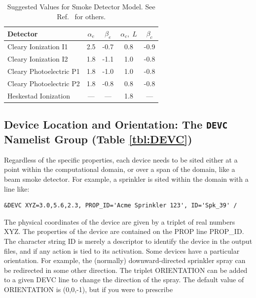\documentclass[11pt]{book}
\begin{document}
\begin{table}[ht]
\caption{Suggested Values for Smoke Detector Model. See Ref.~\cite{SFPE} for others.}
\vspace{0.1in}
\label{tab:sdvalues}
\begin{center}
\begin{tabular}{|l||c|c|c|c|}
\hline
Detector                      & $\alpha_e$  &  $\beta_e$   &  $\alpha_c, \; L$   &  $\beta_c$  \\ \hline \hline
Cleary Ionization    I1       & 2.5         & -0.7         &  0.8                &  -0.9      \\ \hline
Cleary Ionization    I2       & 1.8         & -1.1         &  1.0                &  -0.8      \\ \hline
Cleary Photoelectric P1       & 1.8         & -1.0         &  1.0                &  -0.8      \\ \hline
Cleary Photoelectric P2       & 1.8         & -0.8         &  0.8                &  -0.8      \\ \hline
Heskestad Ionization          & ---         & ---          &  1.8                &  ---       \\ \hline\end{tabular}
\end{center}
\end{table}



\subsection{Device Location and Orientation: The \texorpdfstring{{\tt DEVC}}{DEVC} Namelist Group (Table \ref{tbl:DEVC})}
\label{info:DEVC}

Regardless of the specific properties, each device needs to be sited either at a point within the computational domain, or
over a span of the domain, like a beam smoke detector. For example, a sprinkler is sited within the domain with a line like:

\footnotesize
\begin{verbatim}
&DEVC XYZ=3.0,5.6,2.3, PROP_ID='Acme Sprinkler 123', ID='Spk_39' /
\end{verbatim}
\normalsize

\noindent
The physical coordinates of the
device are given by a triplet of real numbers {\ct XYZ}.
The properties of the device are contained on the {\ct PROP} line {\ct PROP\_ID}.
The character string {\ct ID} is merely a descriptor to identify the
device in the output files, and if any action is tied to its activation.
Some devices have a particular orientation. For example, the (normally) downward-directed sprinkler
spray can be redirected in some other direction. The triplet
{\ct ORIENTATION} can be added to a given {\ct DEVC} line to change the direction of the spray.
The default value of {\ct ORIENTATION} is (0,0,-1), but if you were
to prescribe
\end{document}
